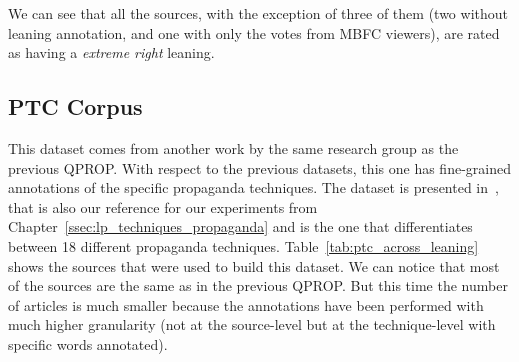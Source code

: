 We can see that all the sources, with the exception of three of them (two without leaning annotation, and one with only the votes from MBFC viewers), are rated as having a \emph{extreme right} leaning.

\subsection{PTC Corpus}
This dataset comes from another work by the same research group as the previous QPROP.
With respect to the previous datasets, this one has fine-grained annotations of the specific propaganda techniques. The dataset is presented in~\citet{da2019fine}, that is also our reference for our experiments from Chapter~\ref{ssec:lp_techniques_propaganda} and is the one that differentiates between 18 different propaganda techniques.
Table~\ref{tab:ptc_across_leaning} shows the sources that were used to build this dataset. We can notice that most of the sources are the same as in the previous QPROP. But this time the number of articles is much smaller because the annotations have been performed with much higher granularity (not at the source-level but at the technique-level with specific words annotated).

